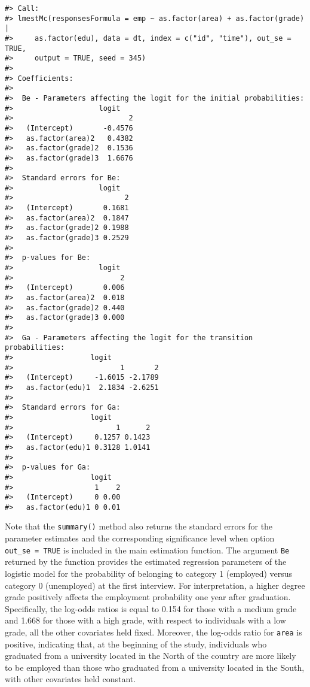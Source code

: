 \begin{verbatim}
#> Call:
#> lmestMc(responsesFormula = emp ~ as.factor(area) + as.factor(grade) | 
#>     as.factor(edu), data = dt, index = c("id", "time"), out_se = TRUE, 
#>     output = TRUE, seed = 345)
#> 
#> Coefficients:
#> 
#>  Be - Parameters affecting the logit for the initial probabilities:
#>                    logit
#>                           2
#>   (Intercept)       -0.4576
#>   as.factor(area)2   0.4382
#>   as.factor(grade)2  0.1536
#>   as.factor(grade)3  1.6676
#> 
#>  Standard errors for Be:
#>                    logit
#>                          2
#>   (Intercept)       0.1681
#>   as.factor(area)2  0.1847
#>   as.factor(grade)2 0.1988
#>   as.factor(grade)3 0.2529
#> 
#>  p-values for Be:
#>                    logit
#>                         2
#>   (Intercept)       0.006
#>   as.factor(area)2  0.018
#>   as.factor(grade)2 0.440
#>   as.factor(grade)3 0.000
#> 
#>  Ga - Parameters affecting the logit for the transition probabilities:
#>                  logit
#>                         1       2
#>   (Intercept)     -1.6015 -2.1789
#>   as.factor(edu)1  2.1834 -2.6251
#> 
#>  Standard errors for Ga:
#>                  logit
#>                        1      2
#>   (Intercept)     0.1257 0.1423
#>   as.factor(edu)1 0.3128 1.0141
#> 
#>  p-values for Ga:
#>                  logit
#>                   1    2
#>   (Intercept)     0 0.00
#>   as.factor(edu)1 0 0.01
\end{verbatim}

Note that the \texttt{summary()} method also returns the standard errors for
the parameter estimates and the corresponding significance level when
option \texttt{out\_se\ =\ TRUE} is included in the main estimation function. The
argument \texttt{Be} returned by the function provides the estimated regression
parameters of the logistic model for the probability of belonging to
category 1 (employed) versus category 0 (unemployed) at the first
interview. For interpretation, a higher degree grade positively affects
the employment probability one year after graduation. Specifically, the
log-odds ratios is equal to 0.154 for those with a medium grade and
1.668 for those with a high grade, with respect to individuals with a
low grade, all the other covariates held fixed.
Moreover,
the log-odds ratio for \texttt{area} is positive, indicating that, at the
beginning of the study, individuals who graduated from a university
located in the North of the country are more likely to be employed than
those who graduated from a university located in the South, with other
covariates held constant.

